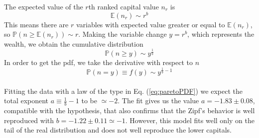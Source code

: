 The expected value of the $r$th ranked capital value $n_r$ is
\begin{equation*}
    \mathbb{E}(n_r)\sim r^b
\end{equation*}
This means there are $r$ variables with expected value greater or equal to $\mathbb{E}(n_r)$, so $\mathbb{P}(n \geq \mathbb{E}(n_r)) \sim r$.
Making the variable change $y=r^b$, which represents the wealth, we obtain the cumulative distribution
\begin{equation*}
    \mathbb{P}(n \geq y) \sim y^{\frac{1}{b}}
\end{equation*}
In order to get the pdf, we take the derivative with respect to $n$
\begin{equation}
    \mathbb{P}(n = y) \equiv f(y) \sim y^{\frac{1}{b} - 1}
    \label{eq:paretoPDF}
\end{equation}
\\Fitting the data with a law of the type in Eq. (\ref{eq:paretoPDF}) we expect the total exponent $a \equiv \frac{1}{b} - 1$ to be $\simeq -2$.
The fit gives us the value $a = -1.83 \pm 0.08$, compatible with the hypothesis, that also confirms that the Zipf's behavior is well reproduced with $b = -1.22 \pm 0.11 \simeq -1$.
However, this model fits well only on the tail of the real distribution and does not well reproduce the lower capitals.
